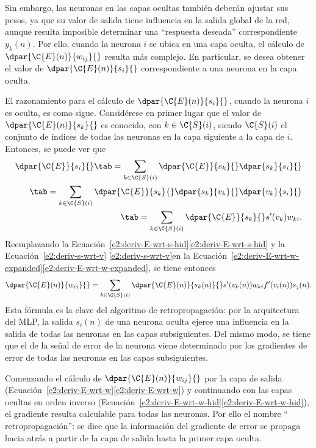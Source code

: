 Sin embargo, las neuronas en las capas ocultas también deberán ajustar
sus pesos, ya que su valor de salida tiene influencia en la salida
global de la red, aunque resulta imposible determinar una ``respuesta
deseada'' correspondiente $y_k(n)$.  Por ello, cuando la neurona $i$
se ubica en una capa oculta, el cálculo de $\dpar{\C{E}(n)}{w_{ij}}{}$
resulta más complejo.  En particular, se desea obtener el valor de
$\dpar{\C{E}(n)}{s_i}{}$ correspondiente a una neurona en la capa
oculta.

El razonamiento para el cálculo de $\dpar{\C{E}(n)}{s_{i}}{}$, cuando
la neurona $i$ es oculta, es como sigue. Considérese en primer lugar
que el valor de $\dpar{\C{E}(n)}{s_k}{}$ es conocido, con
$k\in{}\C{S}(i)$, siendo $\C{S}(i)$ el conjunto de índices de todas
las neuronas en la capa siguiente a la capa de $i$.  Entonces, se
puede ver que
%
\begin{align}
  \dpar{\C{E}}{s_i}{} \tab= \sum_{k\in\C{S}(i)}
      \dpar{\C{E}}{s_k}{}\dpar{s_k}{s_i}{} \notag\\
    \tab= \sum_{k\in\C{S}(i)}
      \dpar{\C{E}}{s_k}{}\dpar{s_k}{v_k}{}\dpar{v_k}{s_i}{} \notag\\
    \tab= \sum_{k\in\C{S}(i)} \dpar{\C{E}}{s_k}{} s'(v_k) w_{ki}.
    \label{e2:deriv-E-wrt-s-hid}
\end{align}
%
Reemplazando la
\iflatexml{}Ecuación~\ref{e2:deriv-E-wrt-s-hid}\else\autoref{e2:deriv-E-wrt-s-hid}\fi
y la \iflatexml{}Ecuación~\ref{e2:deriv-s-wrt-v}
\else\autoref{e2:deriv-s-wrt-v}\fi en la 
\iflatexml{}Ecuación~\ref{e2:deriv-E-wrt-w-expanded}\else\autoref{e2:deriv-E-wrt-w-expanded}\fi,
se tiene entonces
%
\begin{align}\label{e2:deriv-E-wrt-w-hid}
  \dpar{\C{E}(n)}{w_{ij}}{} =
  \sum_{k\in\C{S}(i)} \dpar{\C{E}(n)}{s_k(n)}{} s'(v_k(n)) w_{ki}
  f'(v_i(n)) s_j(n).
\end{align}
%
Esta fórmula es la clave del algoritmo de retropropagación: por la
arquitectura del MLP, la salida $s_i(n)$ de una neurona oculta ejerce
una influencia en la salida de todas las neuronas en las capas
subsiguientes.  Del mismo modo, se tiene que el  de
la señal de error de la neurona viene determinado por los gradientes
de error de todas las neuronas en las capas subsiguientes.

Comenzando el cálculo de $\dpar{\C{E}(n)}{w_{ij}}{}$ por la capa de
salida
(\iflatexml{}Ecuación~\ref{e2:deriv-E-wrt-w}\else\autoref{e2:deriv-E-wrt-w}\fi)
y continuando con las capas ocultas en orden inverso
(\iflatexml{}Ecuación~\ref{e2:deriv-E-wrt-w-hid}\else\autoref{e2:deriv-E-wrt-w-hid}\fi),
el gradiente resulta calculable para todas las neuronas.  Por ello el
nombre `` retropropagación'': se dice que la información del gradiente
de error se propaga hacia atrás a partir de la capa de salida hasta la
primer capa oculta.

